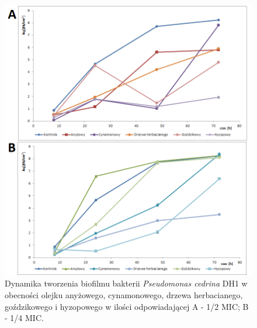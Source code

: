 \documentclass[11pt,a4paper]{report}
\begin{document}
\begin{figure}[!h]
\begin{center}
\includegraphics[scale=0.65]{img/dh2-a.png}
\caption{Dynamika tworzenia biofilmu bakterii \textit{Pseudomonas cedrina} DH1 w obecności olejku anyżowego, cynamonowego, drzewa herbacianego, goździkowego i hyzopowego w ilości odpowiadającej A - 1/2 MIC; B - 1/4 MIC.}\label{dh2-a}
\end{center} 
\end{figure}
\end{document}
